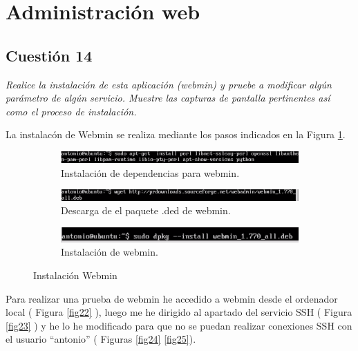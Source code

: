 \section{Administración web}
\subsection{Cuestión 14}
\textit{Realice la instalación de esta aplicación (webmin) y pruebe a modificar algún parámetro de algún servicio. Muestre las capturas de pantalla pertinentes así como el proceso de instalación.}
\newline

La instalacón de Webmin se realiza mediante los pasos indicados en la Figura \ref{fig21}. \cite{webmin}
\begin{figure}[H]
    \centering
    \begin{subfigure}[b]{1\textwidth}
        \includegraphics[width=\textwidth]{imagenes/img22}
        \caption{Instalación de dependencias para webmin.}
    \end{subfigure}
    
        \begin{subfigure}[b]{1\textwidth}
        \includegraphics[width=\textwidth]{imagenes/img23}
        \caption{Descarga de el paquete .ded de webmin.}
    \end{subfigure}
    
        \begin{subfigure}[b]{1\textwidth}
        \includegraphics[width=\textwidth]{imagenes/img24}
        \caption{Instalación de webmin.}
    \end{subfigure}
    \caption{Instalación Webmin}
     \label{fig21} 
\end{figure}

Para realizar una prueba de webmin he accedido a webmin desde el ordenador local ( Figura \ref{fig22} ), luego me he dirigido al apartado del servicio SSH ( Figura \ref{fig23} ) y he lo he modificado para que no se puedan realizar conexiones SSH con el usuario ``antonio'' ( Figuras \ref{fig24} \ref{fig25}).



